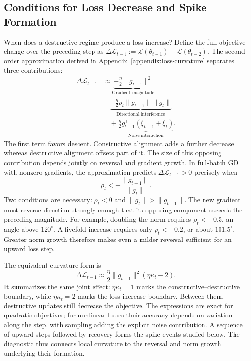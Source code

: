 

\subsection{Conditions for Loss Decrease and Spike Formation}
\label{subsec:loss-connection}

When does a destructive regime produce a loss increase? Define the
full-objective change over the preceding step as
$\Delta\mathcal L_{t-1}:=\mathcal L(\theta_{t-1})-
\mathcal L(\theta_{t-2})$.
The second-order approximation derived in Appendix~\ref{appendix:loss-curvature}
separates three contributions:
\begin{equation}
\begin{aligned}
\Delta\mathcal L_{t-1}
&\approx\underbrace{-\frac{\eta}{2}\|g_{t-1}\|^2}_{\text{Gradient magnitude}}\\
&\quad\underbrace{-\frac{\eta}{2}\rho_t\|g_{t-1}\|\|g_t\|}_{\text{Directional interference}}\\
&\quad+\underbrace{\frac{\eta}{2}g_{t-1}^\top(\xi_{t-1}+\xi_t)}_{\text{Noise interaction}}.
\end{aligned}
\label{eq:loss-curvature}
\end{equation}
The first term favors descent. Constructive alignment adds a further
decrease, whereas destructive alignment offsets part of it. The size
of this opposing contribution depends jointly on reversal and gradient
growth. In full-batch GD with nonzero gradients, the approximation
predicts $\Delta\mathcal L_{t-1}>0$ precisely when
\begin{equation}
  \boxed{\rho_t<-\frac{\|g_{t-1}\|}{\|g_t\|}.}
  \label{eq:loss-rise-alignment}
\end{equation}
Two conditions are necessary: $\rho_t<0$ and
$\|g_t\|>\|g_{t-1}\|$. The new gradient must reverse direction strongly
enough that its opposing component exceeds the preceding magnitude.
For example, doubling the norm requires $\rho_t<-0.5$, an angle above
$120^\circ$. A fivefold increase requires only $\rho_t<-0.2$, or about
$101.5^\circ$. Greater norm growth therefore makes even a milder
reversal sufficient for an upward loss step.

The equivalent curvature form is
\begin{equation}
  \Delta\mathcal L_{t-1}\approx
  \frac{\eta}{2}\|g_{t-1}\|^2(\eta\kappa_t-2).
  \label{eq:loss-rise-curvature}
\end{equation}
It summarizes the same joint effect: $\eta\kappa_t=1$ marks the
constructive--destructive boundary, while $\eta\kappa_t=2$ marks
the loss-increase boundary. Between them, destructive updates still
decrease the objective. The expressions are exact for quadratic
objectives; for nonlinear losses their accuracy depends on variation
along the step, with sampling adding the explicit noise contribution.
A sequence of upward steps followed by recovery forms the spike
events studied below. The diagnostic thus connects local curvature
to the reversal and norm growth underlying their formation.
